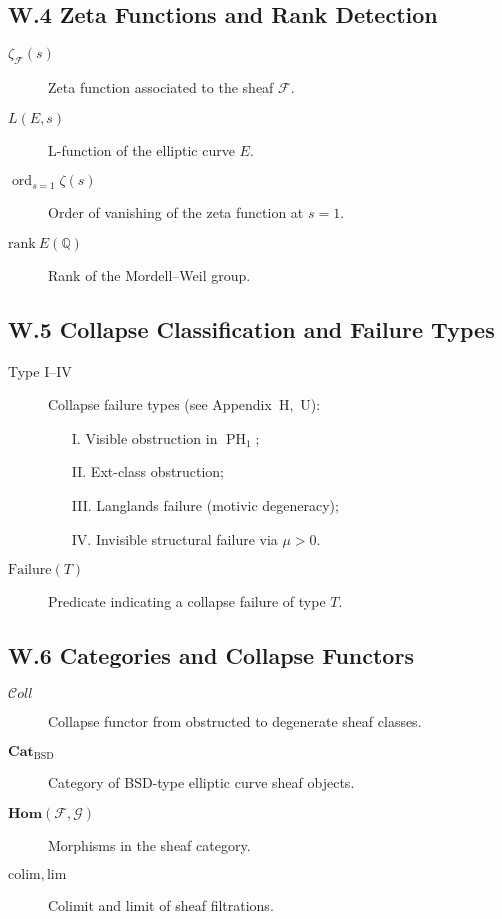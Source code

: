 \documentclass[11pt]{article}
\DeclareMathOperator{\PH}{PH}
\newcommand{\ord}{\operatorname{ord}}
\begin{document}
\subsection*{W.4 Zeta Functions and Rank Detection}

\begin{description}
  \item[\( \zeta_{\mathcal{F}}(s) \)] Zeta function associated to the sheaf \( \mathcal{F} \).
  \item[\( L(E, s) \)] L-function of the elliptic curve \( E \).
  \item[\( \ord_{s = 1} \zeta(s) \)] Order of vanishing of the zeta function at \( s = 1 \).
  \item[\( \mathrm{rank}~E(\mathbb{Q}) \)] Rank of the Mordell–Weil group.
\end{description}

\subsection*{W.5 Collapse Classification and Failure Types}

\begin{description}
  \item[Type I–IV] Collapse failure types (see Appendix~H,~U):
    \begin{itemize}
      \item[I.] Visible obstruction in \( \PH_1 \);
      \item[II.] Ext-class obstruction;
      \item[III.] Langlands failure (motivic degeneracy);
      \item[IV.] Invisible structural failure via \( \mu > 0 \).
    \end{itemize}
  \item[\( \mathrm{Failure}(T) \)] Predicate indicating a collapse failure of type \( T \).
\end{description}


\subsection*{W.6 Categories and Collapse Functors}

\begin{description}
  \item[\( \mathcal{C}oll \)] Collapse functor from obstructed to degenerate sheaf classes.
  \item[\( \mathbf{Cat}_{\mathrm{BSD}} \)] Category of BSD-type elliptic curve sheaf objects.
  \item[\( \mathbf{Hom}(\mathcal{F}, \mathcal{G}) \)] Morphisms in the sheaf category.
  \item[\( \mathrm{colim}, \mathrm{lim} \)] Colimit and limit of sheaf filtrations.
\end{description}
\end{document}
